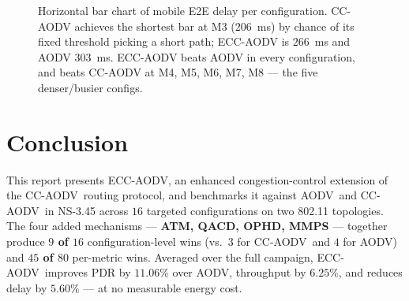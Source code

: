 \documentclass[11pt,a4paper]{article}
\newcommand{\ecc}{ECC-AODV}
\newcommand{\cca}{CC-AODV}
\newcommand{\aodv}{AODV}
\begin{document}
\begin{figure}[H]
\centering
{}
\caption{Horizontal bar chart of mobile E2E delay per configuration.
CC-AODV achieves the shortest bar at M3 ($206$~ms) by chance of its fixed
threshold picking a short path; ECC-AODV is $266$~ms and AODV $303$~ms.
ECC-AODV beats AODV in every configuration, and beats CC-AODV at M4, M5,
M6, M7, M8 — the five denser/busier configs.}
\label{fig:delay-mobile-hbar}
\end{figure}

\section{Conclusion}
\label{sec:conclusion}

This report presents \ecc, an enhanced congestion-control extension of the
\cca\ routing protocol, and benchmarks it against \aodv\ and \cca\ in NS-3.45
across $16$ targeted configurations on two 802.11 topologies. The four added
mechanisms — \textbf{ATM, QACD, OPHD, MMPS} — together produce
\textbf{$9$ of $16$} configuration-level wins (vs.\ $3$ for \cca\ and $4$ for
\aodv) and \textbf{$45$ of $80$} per-metric wins. Averaged over the full
campaign, \ecc\ improves PDR by $11.06\%$ over \aodv, throughput by $6.25\%$,
and reduces delay by $5.60\%$ — at no measurable energy cost.
\end{document}
